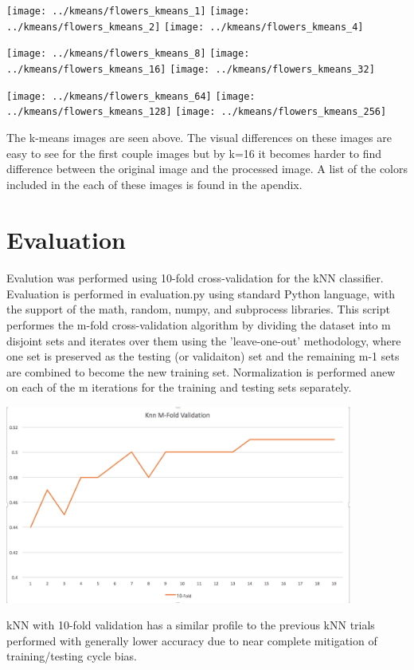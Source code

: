 \documentclass{article}
\begin{document}
\newpage
\centerline{
\texttt{[image: ../kmeans/flowers\_kmeans\_1]}
\texttt{[image: ../kmeans/flowers\_kmeans\_2]}
\texttt{[image: ../kmeans/flowers\_kmeans\_4]}}
\centerline{
\texttt{[image: ../kmeans/flowers\_kmeans\_8]}
\texttt{[image: ../kmeans/flowers\_kmeans\_16]}
\texttt{[image: ../kmeans/flowers\_kmeans\_32]}}
\centerline{
\texttt{[image: ../kmeans/flowers\_kmeans\_64]}
\texttt{[image: ../kmeans/flowers\_kmeans\_128]}
\texttt{[image: ../kmeans/flowers\_kmeans\_256]}}
The k-means images are seen above. The visual differences on these images are 
easy to see for the first couple images but by k=16 it becomes harder to find 
difference between the original image and the processed image. A list of the 
colors included in the each of these images is found in the apendix.
\newpage


\section*{Evaluation}
\paragraph{}
Evalution was performed using 10-fold cross-validation for the kNN classifier.
Evaluation is performed in evaluation.py using standard Python language, with the support of
the math, random, numpy, and subprocess libraries.  This script performes the m-fold
cross-validation algorithm by dividing the dataset into m disjoint sets and iterates over them
using the 'leave-one-out' methodology, where one set is preserved as the testing (or validaiton)
set and the remaining m-1 sets are combined to become the new training set.  Normalization is
performed anew on each of the m iterations for the training and testing sets separately.
\newline
\newline
\centerline{\includegraphics[width = 4.5in]{images/KNN_MFOLD2.png}}
\newline
\newline
kNN with 10-fold validation has a similar profile to the previous kNN trials performed with
generally lower accuracy due to near complete mitigation of training/testing cycle bias.
\newpage
\end{document}
